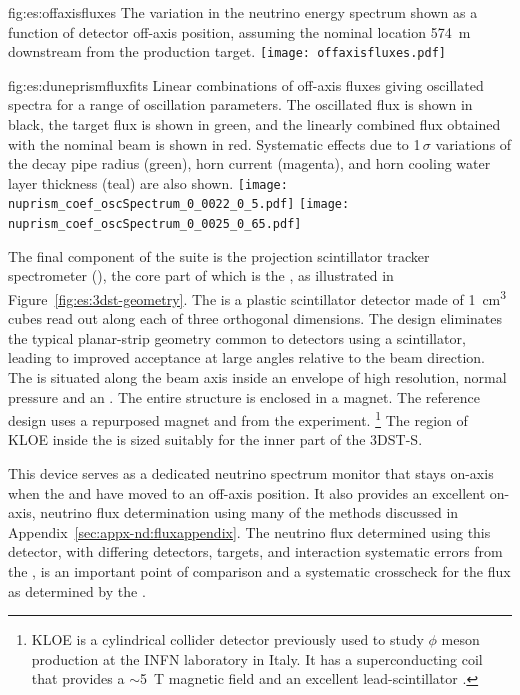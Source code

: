 \begin{dunefigure}{fig:es:offaxisfluxes}
{The variation in the neutrino energy spectrum shown as a function of detector off-axis position, assuming the nominal  location 574~m downstream from the production target.}
\texttt{[image: offaxisfluxes.pdf]}
\end{dunefigure}
\begin{dunefigure}{fig:es:duneprismfluxfits}
{Linear combinations of off-axis fluxes giving  oscillated spectra for a range of oscillation parameters. The   oscillated flux is shown in black, the target flux is shown in green, and the linearly combined flux obtained with the nominal beam  is shown in red. Systematic effects due to 1$\,\sigma$ variations of the decay pipe radius (green), horn current (magenta), and horn cooling water layer thickness (teal) are also shown.}
	\texttt{[image: nuprism\_coef\_oscSpectrum\_0\_0022\_0\_5.pdf]}
	\texttt{[image: nuprism\_coef\_oscSpectrum\_0\_0025\_0\_65.pdf]}
\end{dunefigure}

The final component of the   suite is the \threed projection scintillator tracker spectrometer (),  the core part of which is the , as illustrated in Figure~\ref{fig:es:3dst-geometry}.  The  is a plastic scintillator detector made of \SI{1}{\cubic\centi\meter} cubes read out along each of three orthogonal dimensions.  The design eliminates the typical planar-strip geometry common to detectors using a scintillator, leading to improved acceptance at large angles relative to the beam direction.  The  is situated along the beam axis inside an envelope of high resolution, normal pressure  and an .  The entire structure is enclosed in a magnet. The reference design uses a repurposed magnet and  from the  experiment. \footnote{KLOE is a cylindrical collider detector previously used to study $\phi$ meson production at the INFN laboratory in Italy.  It has a superconducting coil that provides a $\sim$5~T magnetic field and an excellent lead-scintillator  \cite{Franzini:2006aa}.} The region of KLOE inside the  is sized suitably for the inner part of the 3DST-S.


This device serves as a dedicated  neutrino spectrum monitor that stays on-axis when the    and  have moved to an off-axis position. 
It also provides an excellent on-axis, neutrino flux determination using many of the methods discussed in Appendix~\ref{sec:appx-nd:fluxappendix}. The neutrino flux determined using this detector, with  differing detectors, targets, and interaction systematic errors from the , is an important point of comparison and a systematic crosscheck for the flux as determined by the .

